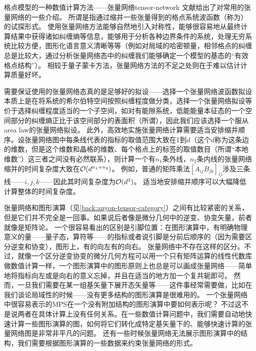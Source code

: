 \begin{back}{格点模型的一种数值计算方法——张量网络}{tensor-network}
    文献\cite{Orus_tensor}给出了对常用的张量网络的一些介绍。
    所谓是指通过缩并一些张量得到的格点系统波函数（称为）的试探形式。
    使用张量网络方法能够自然地引入对称性，能够很容易地从最终计算结果中获得诸如纠缠熵等信息，能够用于分析各种边界条件的系统，处理无穷系统比较方便，图形化语言意义清晰等等（例如对局域的哈密顿量，相邻格点的纠缠总是比较大，通过分析张量网络态中的纠缠我们能够确定一个模型的基态的“有效格点结构”）。
    相较于量子蒙卡方法，张量网络方法的不足之处则在于难以估计计算质量好坏。

    需要保证使用的张量网络态真的是足够好的拟设——选择一个张量网络波函数拟设本质上是在将系统的希尔伯特空间按照纠缠程度做分类，选择一个张量网络拟设等价于选择纠缠程度适当的一个子空间，如对有能隙系统，低能能量本征态的一个空间部分的纠缠熵正比于该空间部分的表面积（所谓），因此我们应该选择一个服从area law的张量网络拟设。
    此外，高效地实施张量网络计算需要适当安排缩并顺序。设张量网络图中每条线代表的指标的取值范围大致在1到$d$（这个$d$称为这条边的维数，但是这个维数和晶格的维数、每个格点上的标签的取值数目（所谓“本地维数”）这三者之间没有必然联系），则计算一个有$n_1$条外线，$n_2$条内线的张量网络缩并的时间复杂度大致在$\mathcal{O}(d^{n_1+n_2})$。
    例如，普通的矩阵乘法$[A_{ij} B_{jk}]_{ij}$涉及三条线——$i, j, k$——因此其时间复杂度为$\mathcal{O}(d^3)$。
    适当地安排缩并顺序可以大幅降低计算整体的时间复杂度。

    张量网络和图形演算（见\autoref{back:anyon-tensor-category}）之间有比较紧密的关系，但是它们并不完全是一回事。如果说后者像是微分几何中的逆变、协变矢量，前者就像是矩阵论。
    一个很容易看出的区别是引脚位置：在图形演算中，有明确物理意义的量——量子态，算符等——的指标或者说引脚是分前后顺序的（因为需要区分逆变和协变），图形上，有的向左有的向右。
    张量网络中不存在这样的区分。不过，就像一个区分逆变协变的微分几何方程可以用一个只有矩阵运算的线性代数库做数值计算一样，一个图形演算中的图形原则上也总是可以画成张量网络——简单地将指标向左或是向右的意义忘掉，并且在适当的地方加一个复共轭即可。
    然而，一旦我们需要在某一组基矢量下展开态矢量等——这件事经常需要做，比如在我们谈论局域性的时候——没有更多结构的图形演算是很难用的。
    一个张量网络中很容易表示的MPS在一个没有附加结构的图形演算中要如何表示呢？
    不过这不是说两者在具体计算上没有任何关系。在一些数值计算问题中，我们需要自动地快速计算一些图形演算的图，如何将它们转化成特定基矢量下的、能够快速计算的张量网络图是非常非平凡的问题。
    还有一些时候张量网络无法展示图形演算中的结构，我们需要根据图形演算的一些数据来约束张量网络的形式。


\end{back}
